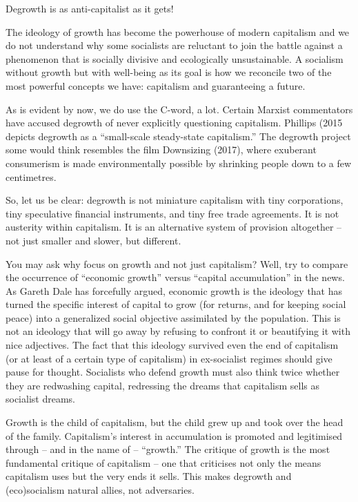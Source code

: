 \documentclass[
]{book}
\begin{document}
Degrowth is as anti-capitalist as it gets!

The ideology of growth has become the powerhouse of modern capitalism and we do not understand why some socialists are reluctant to join the battle against a phenomenon that is socially divisive and ecologically unsustainable. A socialism without growth but with well-being as its goal is how we reconcile two of the most powerful concepts we have: capitalism and guaranteeing a future.

As is evident by now, we do use the C-word, a lot. Certain Marxist commentators have accused degrowth of never explicitly questioning capitalism. Phillips (2015 depicts degrowth as a ``small-scale steady-state capitalism.'' The degrowth project some would think resembles the film Downsizing (2017), where exuberant consumerism is made environmentally possible by shrinking people down to a few centimetres.

So, let us be clear: degrowth is not miniature capitalism with tiny corporations, tiny speculative financial instruments, and tiny free trade agreements. It is not austerity within capitalism. It is an alternative system of provision altogether -- not just smaller and slower, but different.

You may ask why focus on growth and not just capitalism? Well, try to compare the occurrence of ``economic growth'' versus ``capital accumulation'' in the news. As Gareth Dale has forcefully argued, economic growth is the ideology that has turned the specific interest of capital to grow (for returns, and for keeping social peace) into a generalized social objective assimilated by the population. This is not an ideology that will go away by refusing to confront it or beautifying it with nice adjectives. The fact that this ideology survived even the end of capitalism (or at least of a certain type of capitalism) in ex-socialist regimes should give pause for thought. Socialists who defend growth must also think twice whether they are redwashing capital, redressing the dreams that capitalism sells as socialist dreams.

Growth is the child of capitalism, but the child grew up and took over the head of the family. Capitalism's interest in accumulation is promoted and legitimised through -- and in the name of -- ``growth.'' The critique of growth is the most fundamental critique of capitalism -- one that criticises not only the means capitalism uses but the very ends it sells. This makes degrowth and (eco)socialism natural allies, not adversaries.
\end{document}
